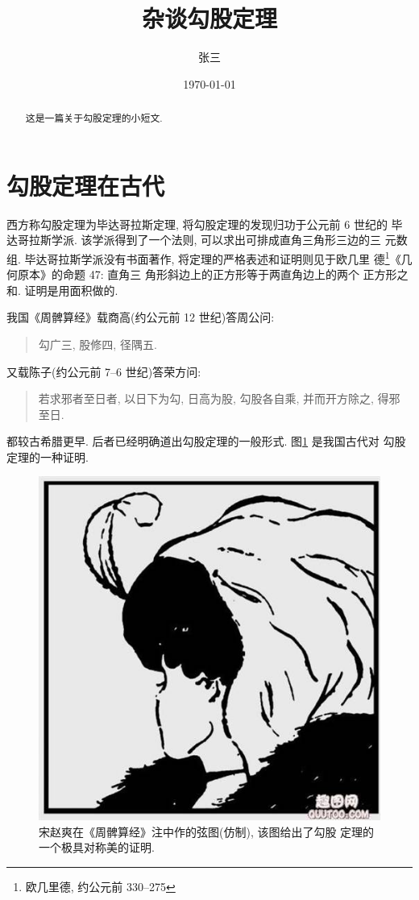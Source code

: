 \documentclass[nofonts]{ctexart}
\title{杂谈勾股定理}
\author{张三}
\date{\today}
\begin{document}
\maketitle

\begin{abstract}
	这是一篇关于勾股定理的小短文.
\end{abstract}

\tableofcontents
\section{勾股定理在古代}\label{se:oldage}
西方称勾股定理为毕达哥拉斯定理, 将勾股定理的发现归功于公元前 6 世纪的
毕达哥拉斯学派\cite{Kline}. 该学派得到了一个法则, 可以求出可排成直角三角形三边的三
元数组. 毕达哥拉斯学派没有书面著作, 将定理的严格表述和证明则见于欧几里
德\footnote{欧几里德, 约公元前 330--275}《几何原本》的命题 47: 直角三
角形斜边上的正方形等于两直角边上的两个
正方形之和. 证明是用面积做的.

我国《周髀算经》载商高(约公元前 12 世纪)答周公问:
\begin{quote}
	 勾广三, 股修四, 径隅五.
\end{quote}
又载陈子(约公元前 7--6 世纪)答荣方问:

\begin{quote}
若求邪者至日者, 以日下为勾, 日高为股, 勾股各自乘, 并而开方除之, 得邪
至日.
\end{quote}

都较古希腊更早. 后者已经明确道出勾股定理的一般形式. 图\ref{fig:xiantu}
是我国古代对 勾股定理的一种证明\cite{quanjing}.
\begin{figure}[ht]
	\centering
	\includegraphics[scale=0.6]{lady.jpg}
	\caption{宋赵爽在《周髀算经》注中作的弦图(仿制), 该图给出了勾股
	定理的一个极具对称美的证明.}
	\label{fig:xiantu}
\end{figure}
\end{document}
